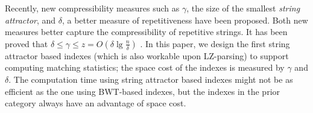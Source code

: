 \documentclass[smallabstract,smallcaptions]{dccpaper}
\begin{document}
	Recently, new compressibility measures such as $\gamma$, the size of the smallest {\em string attractor}, and $\delta$, a better measure of repetitiveness have been proposed. 
	Both new measures better capture the compressibility of repetitive strings.
	It has been proved that $\delta\leq \gamma\leq z = O(\delta \lg \frac{n}{\delta})$ \cite{kempa2018roots, kociumaka2021towards}.
	In this paper, we design the first string attractor based indexes (which is also workable upon LZ-parsing) to support computing matching statistics; the space cost of the indexes is measured by $\gamma$ and $\delta$.
	The computation time using string attractor based indexes might not be as efficient as the one using BWT-based indexes, but the indexes in the prior category always have an advantage of space cost.
	
	
\end{document}

